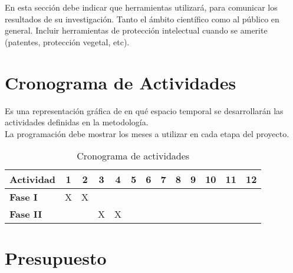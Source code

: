 \documentclass[12pt,a4paper]{article}
\begin{document}
\noindent
En esta sección debe indicar que herramientas utilizará, para comunicar los resultados
de su investigación. Tanto el ámbito científico como al público en general.
Incluir herramientas de protección intelectual cuando se amerite (patentes, protección
vegetal, etc).


\section{Cronograma de Actividades}
\noindent
Es una representación gráfica de en qué espacio temporal se desarrollarán las
actividades definidas en la metodología.\\

\noindent
La programación debe mostrar los meses a utilizar en cada etapa del proyecto.

\begin{table}[H] %
    
    \centering
    \begin{tabular}{lcccccccccccc} %
        \toprule
        \textbf{Actividad} & 1 & 2 & 3 & 4 & 5 & 6 & 7 & 8 & 9 & 10 & 11 & 12 \\
        \midrule
        \textbf{Fase I}  & X & X &  &  &  &  &  &  &  &  &  &  \\
        \textbf{Fase II} &  &  & X & X &  &  &  &  &  &  &  &  \\
        \bottomrule
    \end{tabular}
    \caption{Cronograma de actividades} %
    \label{tab:cronograma}
\end{table}



\section{Presupuesto}
\end{document}
